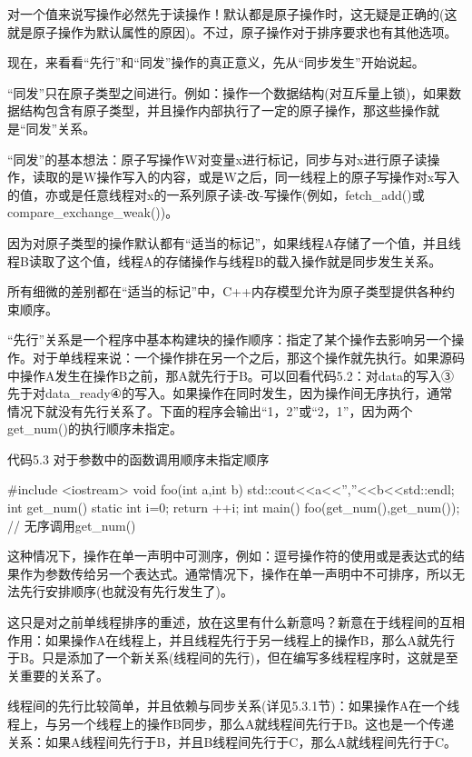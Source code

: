 对一个值来说写操作必然先于读操作！默认都是原子操作时，这无疑是正确的(这就是原子操作为默认属性的原因)。不过，原子操作对于排序要求也有其他选项。

现在，来看看“先行”和“同发”操作的真正意义，先从“同步发生”开始说起。


“同发”只在原子类型之间进行。例如：操作一个数据结构(对互斥量上锁)，如果数据结构包含有原子类型，并且操作内部执行了一定的原子操作，那这些操作就是“同发”关系。

“同发”的基本想法：原子写操作W对变量x进行标记，同步与对x进行原子读操作，读取的是W操作写入的内容，或是W之后，同一线程上的原子写操作对x写入的值，亦或是任意线程对x的一系列原子读-改-写操作(例如，fetch\_add()或compare\_exchange\_weak())。

因为对原子类型的操作默认都有“适当的标记”，如果线程A存储了一个值，并且线程B读取了这个值，线程A的存储操作与线程B的载入操作就是同步发生关系。

所有细微的差别都在“适当的标记”中，C++内存模型允许为原子类型提供各种约束顺序。


“先行”关系是一个程序中基本构建块的操作顺序：指定了某个操作去影响另一个操作。对于单线程来说：一个操作排在另一个之后，那这个操作就先执行。如果源码中操作A发生在操作B之前，那A就先行于B。可以回看代码5.2：对data的写入③先于对data\_ready④的写入。如果操作在同时发生，因为操作间无序执行，通常情况下就没有先行关系了。下面的程序会输出“1，2”或“2，1”，因为两个get\_num()的执行顺序未指定。

代码5.3 对于参数中的函数调用顺序未指定顺序

\begin{cpp}
#include <iostream>
void foo(int a,int b)
{
  std::cout<<a<<”,”<<b<<std::endl;
}
int get_num()
{
  static int i=0;
  return ++i;
}
int main()
{
  foo(get_num(),get_num());  // 无序调用get_num()
}
\end{cpp}

这种情况下，操作在单一声明中可测序，例如：逗号操作符的使用或是表达式的结果作为参数传给另一个表达式。通常情况下，操作在单一声明中不可排序，所以无法先行安排顺序(也就没有先行发生了)。

这只是对之前单线程排序的重述，放在这里有什么新意吗？新意在于线程间的互相作用：如果操作A在线程上，并且线程先行于另一线程上的操作B，那么A就先行于B。只是添加了一个新关系(线程间的先行)，但在编写多线程程序时，这就是至关重要的关系了。

线程间的先行比较简单，并且依赖与同步关系(详见5.3.1节)：如果操作A在一个线程上，与另一个线程上的操作B同步，那么A就线程间先行于B。这也是一个传递关系：如果A线程间先行于B，并且B线程间先行于C，那么A就线程间先行于C。

